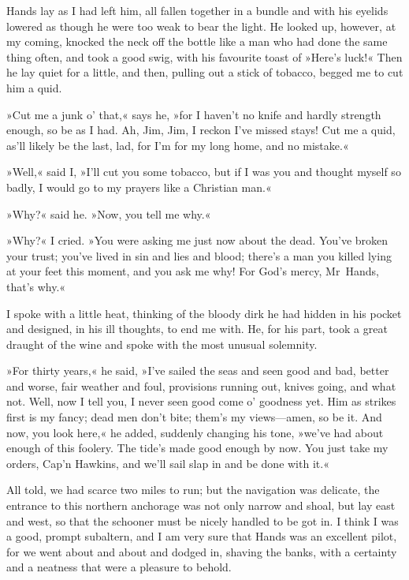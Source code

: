 Hands lay as I had left him, all fallen together in a bundle and with his eyelids lowered as though he were too weak to bear the light. He looked up, however, at my coming, knocked the neck off the bottle like a man who had done the same thing often, and took a good swig, with his favourite toast of »Here's luck!« Then he lay quiet for a little, and then, pulling out a stick of tobacco, begged me to cut him a quid.

»Cut me a junk o' that,« says he, »for I haven't no knife and hardly strength enough, so be as I had. Ah, Jim, Jim, I reckon I've missed stays! Cut me a quid, as'll likely be the last, lad, for I'm for my long home, and no mistake.«

»Well,« said I, »I'll cut you some tobacco, but if I was you and thought myself so badly, I would go to my prayers like a Christian man.«

»Why?« said he. »Now, you tell me why.«

»Why?« I cried. »You were asking me just now about the dead. You've broken your trust; you've lived in sin and lies and blood; there's a man you killed lying at your feet this moment, and you ask me why! For God's mercy, Mr~Hands, that's why.«

I spoke with a little heat, thinking of the bloody dirk he had hidden in his pocket and designed, in his ill thoughts, to end me with. He, for his part, took a great draught of the wine and spoke with the most unusual solemnity.

»For thirty years,« he said, »I've sailed the seas and seen good and bad, better and worse, fair weather and foul, provisions running out, knives going, and what not. Well, now I tell you, I never seen good come o' goodness yet. Him as strikes first is my fancy; dead men don't bite; them's my views—amen, so be it. And now, you look here,« he added, suddenly changing his tone, »we've had about enough of this foolery. The tide's made good enough by now. You just take my orders, Cap'n Hawkins, and we'll sail slap in and be done with it.«

All told, we had scarce two miles to run; but the navigation was delicate, the entrance to this northern anchorage was not only narrow and shoal, but lay east and west, so that the schooner must be nicely handled to be got in. I think I was a good, prompt subaltern, and I am very sure that Hands was an excellent pilot, for we went about and about and dodged in, shaving the banks, with a certainty and a neatness that were a pleasure to behold.

